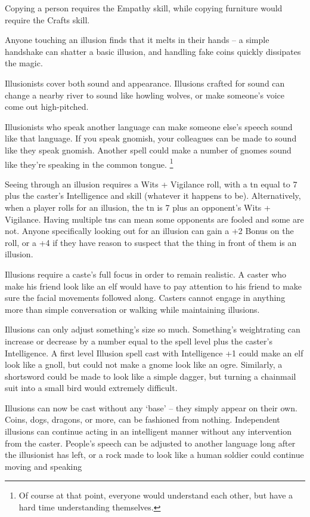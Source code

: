 \begin{multicols}{2}
Copying a person requires the Empathy skill, while copying furniture would require the Crafts skill.

Anyone touching an illusion finds that it melts in their hands -- a simple handshake can shatter a basic illusion, and handling fake coins quickly dissipates the magic.

Illusionists cover both sound and appearance.  Illusions crafted for sound can change a nearby river to sound like howling wolves, or make someone's voice come out high-pitched.

Illusionists who speak another language can make someone else's speech sound like that language.  If you speak gnomish, your colleagues can be made to sound like they speak gnomish.  Another spell could make a number of gnomes sound like they're speaking in the common tongue.  \footnote{Of course at that point, everyone would understand each other, but have a hard time understanding themselves.}

Seeing through an illusion requires a Wits + Vigilance roll, with a \gls{tn} equal to 7 plus the caster's Intelligence and skill (whatever it happens to be).  Alternatively, when a player rolls for an illusion, the \gls{tn} is 7 plus an opponent's Wits + Vigilance.  Having multiple \glspl{tn} can mean some opponents are fooled and some are not.  Anyone specifically looking out for an illusion can gain a +2 Bonus on the roll, or a +4 if they have reason to suspect that the thing in front of them is an illusion.

Illusions require a caste's full focus in order to remain realistic.  A caster who make his friend look like an elf would have to pay attention to his friend to make sure the facial movements followed along.  Casters cannot engage in anything more than simple conversation or walking while maintaining illusions.

Illusions can only adjust something's size so much.
Something's \gls{weightrating} can increase or decrease by a number equal to the spell level plus the caster's Intelligence.
A first level Illusion spell cast with Intelligence +1 could make an elf look like a gnoll, but could not make a gnome look like an ogre.
Similarly, a shortsword could be made to look like a simple dagger, but turning a chainmail suit into a small bird would extremely difficult.


Illusions can now be cast without any `base' -- they simply appear on their own.  Coins, dogs, dragons, or more, can be fashioned from nothing.  Independent illusions can continue acting in an intelligent manner without any intervention from the caster.   People's speech can be adjusted to another language long after the illusionist has left, or a rock made to look like a human soldier could continue moving and speaking 


\end{multicols}
